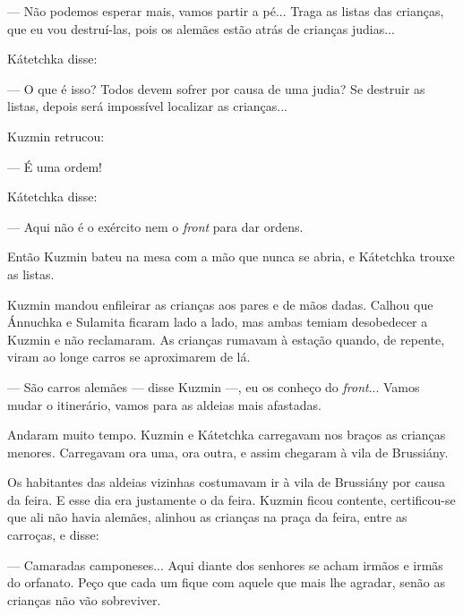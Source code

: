 --- Não podemos esperar mais, vamos partir a pé... Traga as listas das
crianças, que eu vou destruí-las, pois os alemães estão atrás de
crianças judias...

Kátetchka disse:

--- O que é isso? Todos devem sofrer por causa de uma judia? Se destruir
as listas, depois será impossível localizar as crianças...

Kuzmin retrucou:

--- É uma ordem!

Kátetchka disse:

--- Aqui não é o exército nem o \emph{front} para dar ordens.

Então Kuzmin bateu na mesa com a mão que nunca se abria, e Kátetchka
trouxe as listas.

Kuzmin mandou enfileirar as crianças aos pares e de mãos dadas. Calhou
que Ánnuchka e Sulamita ficaram lado a lado, mas ambas temiam
desobedecer a Kuzmin e não reclamaram. As crianças rumavam à estação
quando, de repente, viram ao longe carros se aproximarem de lá.

--- São carros alemães --- disse Kuzmin ---, eu os conheço do
\emph{front}... Vamos mudar o itinerário, vamos para as aldeias mais
afastadas.

Andaram muito tempo. Kuzmin e Kátetchka carregavam nos braços as
crianças menores. Carregavam ora uma, ora outra, e assim chegaram à vila
de Brussiány.

Os habitantes das aldeias vizinhas costumavam ir à vila de Brussiány por
causa da feira. E esse dia era justamente o da feira. Kuzmin ficou
contente, certificou-se que ali não havia alemães, alinhou as crianças
na praça da feira, entre as carroças, e disse:

--- Camaradas camponeses... Aqui diante dos senhores se acham irmãos e
irmãs do orfanato. Peço que cada um fique com aquele que mais lhe
agradar, senão as crianças não vão sobreviver.

